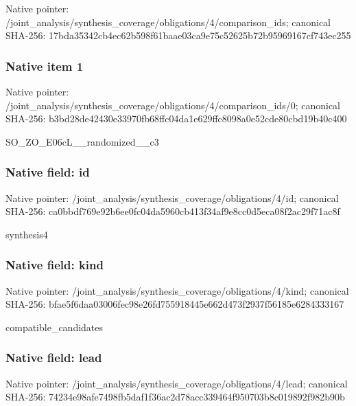 \documentclass[10pt,a4paper]{article}
\begin{document}
Native pointer: /joint\_analysis/synthesi\allowbreak{}s\_coverage/obligations/4\allowbreak{}/comparison\_ids; canonical SHA-256: 17bda35342cb4ec62b598f61\allowbreak{}baae03ca9e75c52625b72b95\allowbreak{}969167cf743ec255



\subsubsection{Native item 1}


Native pointer: /joint\_analysis/synthesi\allowbreak{}s\_coverage/obligations/4\allowbreak{}/comparison\_ids/0; canonical SHA-256: b3bd28de42430e33970fb68f\allowbreak{}fc04da1e629ffc8098a0e52c\allowbreak{}de80cbd19b40c400


SO\_ZO\_E06cL\_\_randomized\_\_c3


\subsubsection{Native field: id}


Native pointer: /joint\_analysis/synthesi\allowbreak{}s\_coverage/obligations/4\allowbreak{}/id; canonical SHA-256: ca0bbdf769e92b6ee0fc04da\allowbreak{}5960cb413f34af9e8cc0d5ec\allowbreak{}a08f2ac29f71ac8f


synthesis4


\subsubsection{Native field: kind}


Native pointer: /joint\_analysis/synthesi\allowbreak{}s\_coverage/obligations/4\allowbreak{}/kind; canonical SHA-256: bfae5f6daa03006fec98e26f\allowbreak{}d755918445e662d473f2937f\allowbreak{}56185e6284333167


compatible\_candidates


\subsubsection{Native field: lead}


Native pointer: /joint\_analysis/synthesi\allowbreak{}s\_coverage/obligations/4\allowbreak{}/lead; canonical SHA-256: 74234e98afe7498fb5daf1f3\allowbreak{}6ac2d78acc339464f950703b\allowbreak{}8c019892f982b90b
\end{document}

